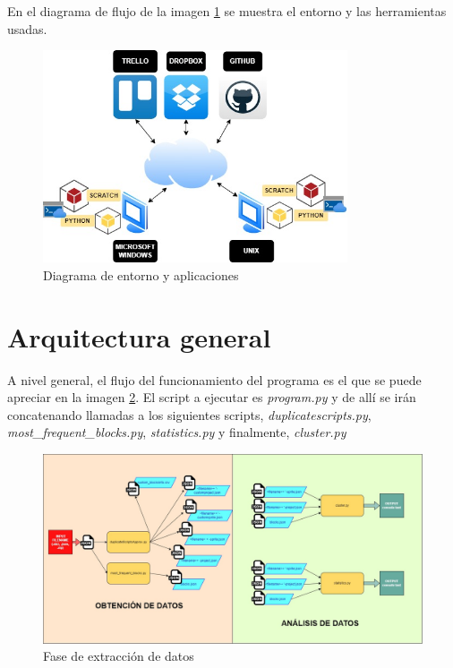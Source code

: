 \documentclass[a4paper, 12pt]{book}
\begin{document}
En el diagrama de flujo de la imagen \ref{fig:diagrama_trabajo} se muestra el entorno y las herramientas usadas.

 \begin{figure}[!h]
    \centering
    \includegraphics[width=9cm, keepaspectratio]{img/workplace.jpg}
    \caption{Diagrama de entorno y aplicaciones}
    \label{fig:diagrama_trabajo}
 \end{figure}

\section{Arquitectura general} 
\label{sec:arquitectura}



A nivel general, el flujo del funcionamiento del programa es el que se puede apreciar en la imagen \ref{fig:fasedesejecucion}. El script a ejecutar es \textit{program.py} y de allí se irán concatenando llamadas a los siguientes scripts, \textit{duplicatescripts.py}, \textit{most\_frequent\_blocks.py}, \textit{statistics.py} y finalmente, \textit{cluster.py}

\begin{figure}
  \centering
  \includegraphics[width=15cm, keepaspectratio]{img/flow.jpg}
  \caption{Fase de extracción de datos}
  \label{fig:fasedesejecucion}
\end{figure}
\end{document}

